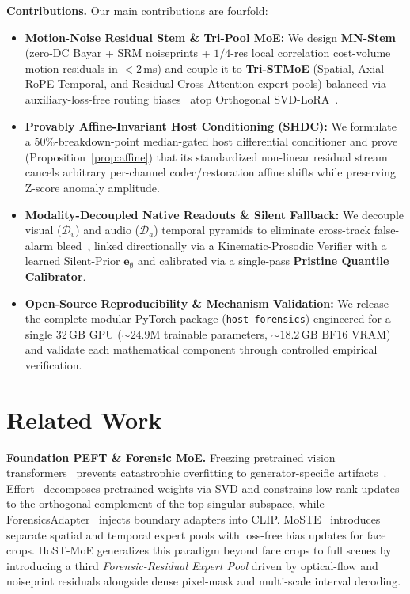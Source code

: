 \documentclass[10pt,twocolumn]{article}
\begin{document}
\noindent\textbf{Contributions.} Our main contributions are fourfold:
\begin{itemize}[leftmargin=1.3em,itemsep=1pt,topsep=2pt]
    \item \textbf{Motion-Noise Residual Stem \& Tri-Pool MoE:} We design \textbf{MN-Stem} (zero-DC Bayar + SRM noiseprints + $1/4$-res local correlation cost-volume motion residuals in $<2$\,ms) and couple it to \textbf{Tri-STMoE} (Spatial, Axial-RoPE Temporal, and Residual Cross-Attention expert pools) balanced via auxiliary-loss-free routing biases~\cite{deepseek2024v3} atop Orthogonal SVD-LoRA~\cite{yan2025effort}.
    \item \textbf{Provably Affine-Invariant Host Conditioning (SHDC):} We formulate a 50\%-breakdown-point median-gated host differential conditioner and prove (Proposition~\ref{prop:affine}) that its standardized non-linear residual stream cancels arbitrary per-channel codec/restoration affine shifts while preserving Z-score anomaly amplitude.
    \item \textbf{Modality-Decoupled Native Readouts \& Silent Fallback:} We decouple visual ($\mathcal{D}_v$) and audio ($\mathcal{D}_a$) temporal pyramids to eliminate cross-track false-alarm bleed~\cite{huang2026avfable}, linked directionally via a Kinematic-Prosodic Verifier with a learned Silent-Prior $\mathbf{e}_\emptyset$ and calibrated via a single-pass \textbf{Pristine Quantile Calibrator}.
    \item \textbf{Open-Source Reproducibility \& Mechanism Validation:} We release the complete modular PyTorch package (\texttt{host-forensics}) engineered for a single 32\,GB GPU (${\sim}24.9$M trainable parameters, ${\sim}18.2$\,GB BF16 VRAM) and validate each mathematical component through controlled empirical verification.
\end{itemize}

\section{Related Work}
\label{sec:related}

\noindent\textbf{Foundation PEFT \& Forensic MoE.} Freezing pretrained vision transformers~\cite{ojha2023universalfake,simeoni2025dinov3} prevents catastrophic overfitting to generator-specific artifacts~\cite{yan2023deepfakebench,yan2024df40}. Effort~\cite{yan2025effort} decomposes pretrained weights via SVD and constrains low-rank updates to the orthogonal complement of the top singular subspace, while ForensicsAdapter~\cite{cui2025forensicsadapter} injects boundary adapters into CLIP. MoSTE~\cite{moste2026} introduces separate spatial and temporal expert pools with loss-free bias updates for face crops. HoST-MoE generalizes this paradigm beyond face crops to full scenes by introducing a third \emph{Forensic-Residual Expert Pool} driven by optical-flow and noiseprint residuals alongside dense pixel-mask and multi-scale interval decoding.
\end{document}
